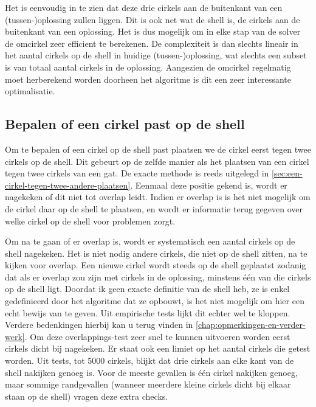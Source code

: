\documentclass[12pt,a4paper,oneside]{book}
\begin{document}
Het is eenvoudig in te zien dat deze drie cirkels aan de buitenkant van een (tussen-)oplossing zullen liggen.
Dit is ook net wat de shell is, de cirkels aan de buitenkant van een oplossing.
Het is dus mogelijk om in elke stap van de solver de omcirkel zeer efficient te berekenen.
De complexiteit is dan slechts lineair in het aantal cirkels op de shell in huidige (tussen-)oplossing, wat slechts een subset is van totaal aantal cirkels in de oplossing.
Aangezien de omcirkel regelmatig moet herberekend worden doorheen het algoritme is dit een zeer interessante optimalisatie.

\subsection{Bepalen of een cirkel past op de shell} \label{sec:bepalen-of-een-cirkel-past-op-de-shell}

Om te bepalen of een cirkel op de shell past plaatsen we de cirkel eerst tegen twee cirkels op de shell.
Dit gebeurt op de zelfde manier als het plaatsen van een cirkel tegen twee cirkels van een gat.
De exacte methode is reeds uitgelegd in \autoref{sec:een-cirkel-tegen-twee-andere-plaatsen}.
Eenmaal deze positie gekend is, wordt er nagekeken of dit niet tot overlap leidt.
Indien er overlap is is het niet mogelijk om de cirkel daar op de shell te plaatsen, en wordt er informatie terug gegeven over welke cirkel op de shell voor problemen zorgt.

Om na te gaan of er overlap is, wordt er systematisch een aantal cirkels op de shell nagekeken.
Het is niet nodig andere cirkels, die niet op de shell zitten, na te kijken voor overlap.
Een nieuwe cirkel wordt steeds op de shell geplaatst zodanig dat als er overlap zou zijn met cirkels in de oplossing, minstens één van die cirkels op de shell ligt.
Doordat ik geen exacte definitie van de shell heb, ze is enkel gedefinieerd door het algoritme dat ze opbouwt, is het niet mogelijk om hier een echt bewijs van te geven.
Uit empirische tests lijkt dit echter wel te kloppen.
Verdere bedenkingen hierbij kan u terug vinden in \autoref{chap:opmerkingen-en-verder-werk}.
Om deze overlappings-test zeer snel te kunnen uitvoeren worden eerst cirkels dicht bij nagekeken.
Er staat ook een limiet op het aantal cirkels die getest worden.
Uit tests, tot 5000 cirkels, blijkt dat drie cirkels aan elke kant van de shell nakijken genoeg is.
Voor de meeste gevallen is één cirkel nakijken genoeg, maar sommige randgevallen (wanneer meerdere kleine cirkels dicht bij elkaar staan op de shell) vragen deze extra checks.
\end{document}

